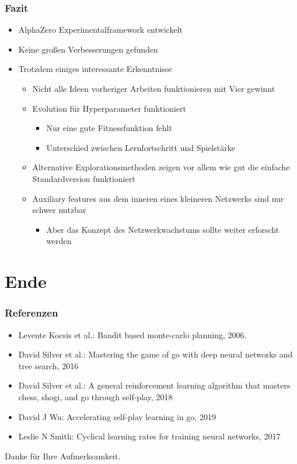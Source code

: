 \begin{frame}
 \frametitle{Fazit}
  


\begin{itemize}
  \item \pause AlphaZero Experimentalframework entwickelt
  \item \pause Keine großen Verbesserungen gefunden
  \item \pause Trotzdem einiges interessante Erkenntnisse
\begin{itemize}
  \item \pause Nicht alle Ideen vorheriger Arbeiten funktionieren mit Vier gewinnt
  \item \pause Evolution für Hyperparameter funktioniert
\begin{itemize}
  \item \pause Nur eine gute Fitnessfunktion fehlt
  \item \pause Unterschied zwischen Lernfortschritt und Spielstärke
\end{itemize}
  \item \pause Alternative Explorationsmethoden zeigen vor allem wie gut die einfache Standardversion funktioniert
  \item \pause Auxiliary features aus dem inneren eines kleineren Netzwerks sind nur schwer nutzbar
\begin{itemize}
  \item \pause Aber das Konzept des Netzwerkwachstums sollte weiter erforscht werden
\end{itemize}
\end{itemize}
\end{itemize}


  
\end{frame}

\section{Ende}



\begin{frame}
 \frametitle{Referenzen}
  


\begin{itemize}
  \item Levente Kocsis et al.: Bandit based monte-carlo planning, 2006.
  \item David Silver et al.: Mastering the game of go with deep neural networks and tree search, 2016
  \item David Silver et al.: A general reinforcement learning algorithm that masters chess, shogi, and go through self-play, 2018
  \item David J Wu: Accelerating self-play learning in go, 2019
  \item Leslie N Smith: Cyclical learning rates for training neural networks, 2017
\end{itemize}

\centering Danke für Ihre Aufmerksamkeit.


  
\end{frame}

